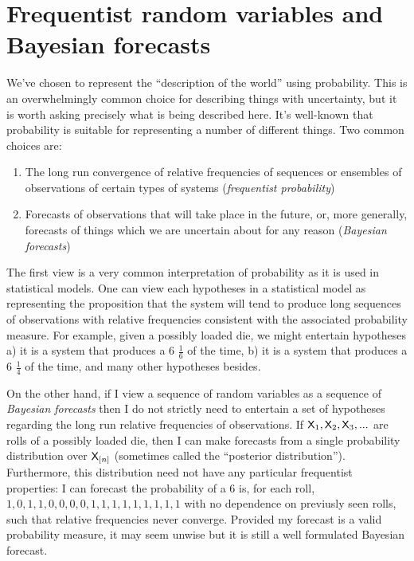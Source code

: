 \section{Frequentist random variables and Bayesian forecasts}

We've chosen to represent the ``description of the world'' using probability. This is an overwhelmingly common choice for describing things with uncertainty, but it is worth asking precisely what is being described here. It's well-known that probability is suitable for representing a number of different things. Two common choices are:

\begin{enumerate}
    \item The long run convergence of relative frequencies of sequences or ensembles of observations of certain types of systems (\emph{frequentist probability})
    \item Forecasts of observations that will take place in the future, or, more generally, forecasts of things which we are uncertain about for any reason (\emph{Bayesian forecasts})
\end{enumerate}

The first view is a very common interpretation of probability as it is used in statistical models. One can view each hypotheses in a statistical model as representing the proposition that the system will tend to produce long sequences of observations with relative frequencies consistent with the associated probability measure. For example, given a possibly loaded die, we might entertain hypotheses a) it is a system that produces a 6 $\frac{1}{6}$ of the time, b) it is a system that produces a 6 $\frac{1}{4}$ of the time, and many other hypotheses besides. 

On the other hand, if I view a sequence of random variables as a sequence of \emph{Bayesian forecasts} then I do not strictly need to entertain a set of hypotheses regarding the long run relative frequencies of observations. If $\mathsf{X}_1,\mathsf{X}_2,\mathsf{X}_3,...$ are rolls of a possibly loaded die, then I can make forecasts from a single probability distribution over $\mathsf{X}_{[n]}$ (sometimes called the ``posterior distribution''). Furthermore, this distribution need not have any particular frequentist properties: I can forecast the probability of a $6$ is, for each roll, $1,0,1,1,0,0,0,0,1,1,1,1,1,1,1,1,1$ with no dependence on previusly seen rolls, such that relative frequencies never converge. Provided my forecast is a valid probability measure, it may seem unwise but it is still a well formulated Bayesian forecast.

